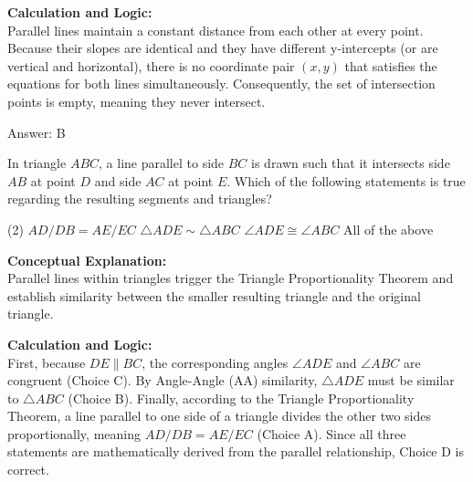 \documentclass[11pt,paper=a4,answers]{exam}
\begin{document}
\begin{questions}
\begin{solution}
\vspace{30pt}

\textbf{Calculation and Logic:} \\
Parallel lines maintain a constant distance from each other at every point. Because their slopes are identical and they have different y-intercepts (or are vertical and horizontal), there is no coordinate pair $(x, y)$ that satisfies the equations for both lines simultaneously. Consequently, the set of intersection points is empty, meaning they never intersect.

\vspace{30pt}

Answer: \colorbox{yellow!100}{B}
\end{solution}

\vspace{60pt}

\question
In triangle $ABC$, a line parallel to side $BC$ is drawn such that it intersects side $AB$ at point $D$ and side $AC$ at point $E$. Which of the following statements is true regarding the resulting segments and triangles?
\begin{tasks}(2)
    \task $AD/DB = AE/EC$
    \task $\triangle ADE \sim \triangle ABC$
    \task $\angle ADE \cong \angle ABC$
    \task All of the above
\end{tasks}

\begin{solution}
\textbf{Conceptual Explanation:} \\
Parallel lines within triangles trigger the Triangle Proportionality Theorem and establish similarity between the smaller resulting triangle and the original triangle.

\vspace{30pt}

\textbf{Calculation and Logic:} \\
First, because $DE \parallel BC$, the corresponding angles $\angle ADE$ and $\angle ABC$ are congruent (Choice C). By Angle-Angle (AA) similarity, $\triangle ADE$ must be similar to $\triangle ABC$ (Choice B). Finally, according to the Triangle Proportionality Theorem, a line parallel to one side of a triangle divides the other two sides proportionally, meaning $AD/DB = AE/EC$ (Choice A). Since all three statements are mathematically derived from the parallel relationship, Choice D is correct.

\vspace{30pt}


\end{solution}
\end{questions}
\end{document}
